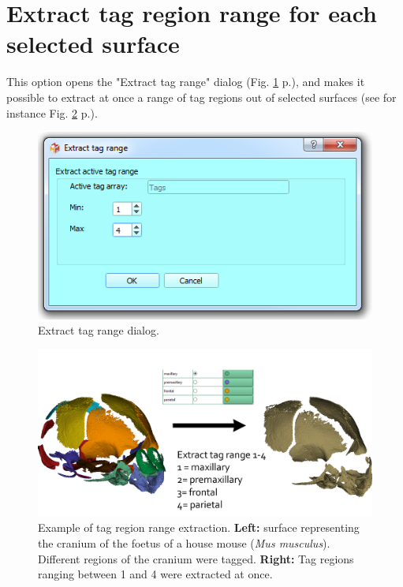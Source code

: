 \section{Extract tag region range for each selected surface}\label{extract_tag_range_section}
This option opens the "Extract tag range" dialog (Fig. \ref{extract_tag_range_dialog} p.\pageref{extract_tag_range_dialog}), and makes it possible to extract at once a range of tag regions out of selected surfaces (see for instance Fig. \ref{extract_tag_range_example} p.\pageref{extract_tag_range_example}).
\begin{figure}
  \centering
  \includegraphics[scale=0.5]{images/12/extract_tag_range_dialog.png} 
	\caption{Extract tag range dialog. }
\label{extract_tag_range_dialog}

\end{figure}

\begin{figure}
  \centering
  \includegraphics[scale=0.4]{images/12/extract_tag_range_example.png} 
	\caption{Example of tag region range extraction. \textbf{Left:} surface representing the cranium of the foetus of a house mouse (\textit{Mus musculus}). Different regions of the cranium were tagged.  \textbf{Right:} Tag regions ranging between 1 and 4 were extracted at once. }
\label{extract_tag_range_example}

\end{figure}


